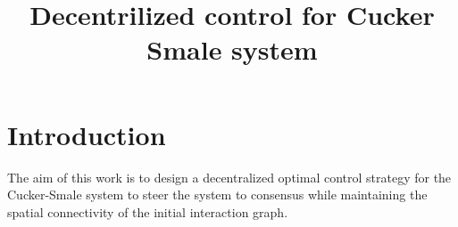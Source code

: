 \documentclass[a4paper,10pt, english]{article}
\begin{document}
\title{Decentrilized control for Cucker Smale system}
\author{}
\maketitle












\section{Introduction}
The aim of this work is to design a decentralized optimal control strategy for the Cucker-Smale system to steer the system to consensus while maintaining the spatial connectivity of the initial interaction graph.
\end{document}
